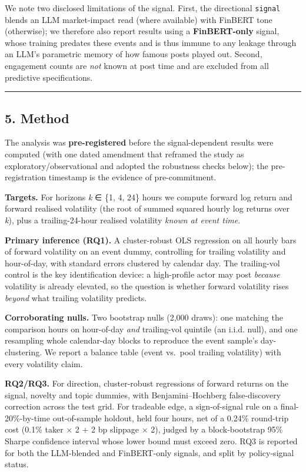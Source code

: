 \documentclass[
]{article}
\begin{document}
We note two disclosed limitations of the signal. First, the directional
\texttt{signal} blends an LLM market-impact read (where available) with
FinBERT tone (otherwise); we therefore also report results using a
\textbf{FinBERT-only} signal, whose training predates these events and
is thus immune to any leakage through an LLM's parametric memory of how
famous posts played out. Second, engagement counts are \emph{not} known
at post time and are excluded from all predictive specifications.

\begin{center}\rule{0.5\linewidth}{0.5pt}\end{center}

\subsection{5. Method}\label{method}

The analysis was \textbf{pre-registered} before the signal-dependent
results were computed (with one dated amendment that reframed the study
as exploratory/observational and adopted the robustness checks below);
the pre-registration timestamp is the evidence of pre-commitment.

\textbf{Targets.} For horizons \emph{k} ∈ \{1, 4, 24\} hours we compute
forward log return and forward realised volatility (the root of summed
squared hourly log returns over \emph{k}), plus a trailing-24-hour
realised volatility \emph{known at event time}.

\textbf{Primary inference (RQ1).} A cluster-robust OLS regression on all
hourly bars of forward volatility on an event dummy, controlling for
trailing volatility and hour-of-day, with standard errors clustered by
calendar day. The trailing-vol control is the key identification device:
a high-profile actor may post \emph{because} volatility is already
elevated, so the question is whether forward volatility rises
\emph{beyond} what trailing volatility predicts.

\textbf{Corroborating nulls.} Two bootstrap nulls (2,000 draws): one
matching the comparison hours on hour-of-day \emph{and} trailing-vol
quintile (an i.i.d. null), and one resampling whole calendar-day blocks
to reproduce the event sample's day-clustering. We report a balance
table (event vs.~pool trailing volatility) with every volatility claim.

\textbf{RQ2/RQ3.} For direction, cluster-robust regressions of forward
returns on the signal, novelty and topic dummies, with
Benjamini--Hochberg false-discovery correction across the test grid. For
tradeable edge, a sign-of-signal rule on a final-20\%-by-time
out-of-sample holdout, held four hours, net of a 0.24\% round-trip cost
(0.1\% taker × 2 + 2 bp slippage × 2), judged by a block-bootstrap 95\%
Sharpe confidence interval whose lower bound must exceed zero. RQ3 is
reported for both the LLM-blended and FinBERT-only signals, and split by
policy-signal status.
\end{document}
